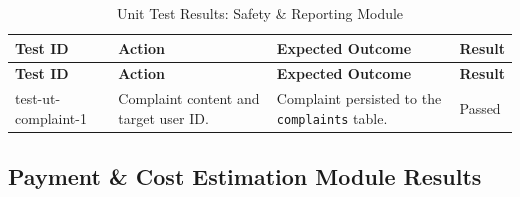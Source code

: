 \small
\begin{longtable}{|p{}|>{\raggedright\arraybackslash}p{}|>{\raggedright\arraybackslash}p{}|p{}|}
\hline
\textbf{Test ID} & \textbf{Action} & \textbf{Expected Outcome} & \textbf{Result} \\
\hline
\endfirsthead

\hline
\textbf{Test ID} & \textbf{Action} & \textbf{Expected Outcome} & \textbf{Result} \\
\hline
\endhead

\hline
\endfoot

\hline
\caption{Unit Test Results: Safety \& Reporting Module}
\endlastfoot

test-ut-complaint-1 & Complaint content and target user ID. & Complaint persisted to the \texttt{complaints} table. & Passed \\
\hline
\end{longtable}

\subsection{Payment \& Cost Estimation Module Results}

